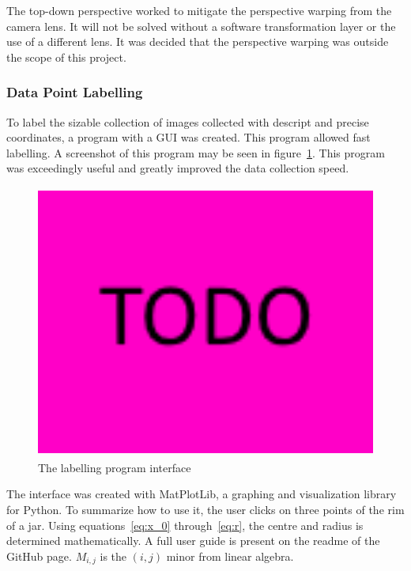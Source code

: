 \documentclass[11pt]{article}
\begin{document}
                The top-down perspective worked to mitigate the perspective warping from the camera lens. It will not be solved without a software transformation layer or the use of a different lens. It was decided that the perspective warping was outside the scope of this project.

            \subsubsection{Data Point Labelling}
                To label the sizable collection of images collected with descript and precise coordinates, a program with a GUI was created. This program allowed fast labelling. A screenshot of this program may be seen in figure~\ref{fig:label-gui}. This program was exceedingly useful and greatly improved the data collection speed.

                \begin{figure}[ht]
                    \centering
                    \includegraphics[height=9cm]{images/TODO.png}
                    \caption{The labelling program interface}\label{fig:label-gui}
                \end{figure}

                The interface was created with MatPlotLib, a graphing and visualization library for Python. To summarize how to use it, the user clicks on three points of the rim of a jar. Using equations~\ref{eq:x_0} through~\ref{eq:r}, the centre and radius is determined mathematically. A full user guide is present on the readme of the GitHub page. \(M_{i,j}\) is the \((i,j)\) minor from linear algebra. 
\end{document}
